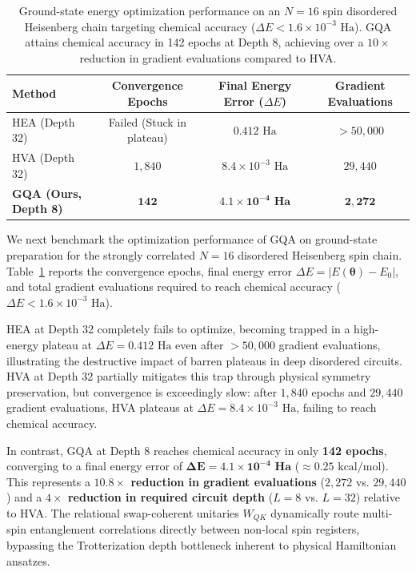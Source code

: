 \documentclass{article}
\begin{document}
\begin{table}[t]
\caption{Ground-state energy optimization performance on an $N=16$ spin disordered Heisenberg chain targeting chemical accuracy ($\Delta E < 1.6 \times 10^{-3}\text{ Ha}$). GQA attains chemical accuracy in 142 epochs at Depth 8, achieving over a $10\times$ reduction in gradient evaluations compared to HVA.}
\label{tab:heisenberg_convergence}
\begin{center}
\begin{tabular}{lccc}
\toprule
\textbf{Method} & \textbf{Convergence Epochs} & \textbf{Final Energy Error ($\Delta E$)} & \textbf{Gradient Evaluations} \\
\midrule
HEA (Depth 32)      & Failed (Stuck in plateau) & $0.412\text{ Ha}$           & $>50{,}000$ \\
HVA (Depth 32)      & $1{,}840$                 & $8.4 \times 10^{-3}\text{ Ha}$ & $29{,}440$ \\
\textbf{GQA (Ours, Depth 8)} & $\mathbf{142}$   & $\mathbf{4.1 \times 10^{-4}\text{ Ha}}$ & $\mathbf{2{,}272}$ \\
\bottomrule
\end{tabular}
\end{center}
\end{table}

We next benchmark the optimization performance of GQA on ground-state preparation for the strongly correlated $N=16$ disordered Heisenberg spin chain. Table~\ref{tab:heisenberg_convergence} reports the convergence epochs, final energy error $\Delta E = |E(\boldsymbol{\theta}) - E_0|$, and total gradient evaluations required to reach chemical accuracy ($\Delta E < 1.6 \times 10^{-3}\text{ Ha}$).

HEA at Depth 32 completely fails to optimize, becoming trapped in a high-energy plateau at $\Delta E = 0.412\text{ Ha}$ even after $>50{,}000$ gradient evaluations, illustrating the destructive impact of barren plateaus in deep disordered circuits. HVA at Depth 32 partially mitigates this trap through physical symmetry preservation, but convergence is exceedingly slow: after $1{,}840$ epochs and $29{,}440$ gradient evaluations, HVA plateaus at $\Delta E = 8.4 \times 10^{-3}\text{ Ha}$, failing to reach chemical accuracy.

In contrast, GQA at Depth 8 reaches chemical accuracy in only \textbf{142 epochs}, converging to a final energy error of $\mathbf{\Delta E = 4.1 \times 10^{-4}\text{ Ha}}$ ($\approx 0.25\text{ kcal/mol}$). This represents a \textbf{$10.8\times$ reduction in gradient evaluations} ($2{,}272$ vs. $29{,}440$) and a \textbf{$4\times$ reduction in required circuit depth} ($L=8$ vs. $L=32$) relative to HVA. The relational swap-coherent unitaries $W_{QK}$ dynamically route multi-spin entanglement correlations directly between non-local spin registers, bypassing the Trotterization depth bottleneck inherent to physical Hamiltonian ansatzes.
\end{document}
